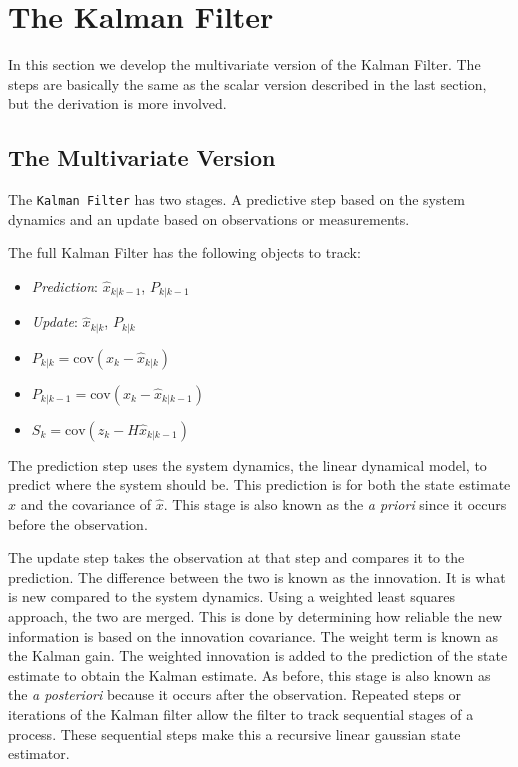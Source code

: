 \hypertarget{the-kalman-filter}{%
\section{The Kalman Filter}\label{the-kalman-filter}}

In this section we develop the multivariate version of the Kalman
Filter. The steps are basically the same as the scalar version described
in the last section, but the derivation is more involved.

\hypertarget{the-multivariate-version}{%
\subsection{The Multivariate Version}\label{the-multivariate-version}}

The \texttt{Kalman\ Filter} has two stages. A predictive step based on
the system dynamics and an update based on observations or measurements.

The full Kalman Filter has the following objects to track:

\begin{itemize}
\tightlist
\item
  \emph{Prediction}: \(\hat{x}_{k|k-1}\), \(P_{k|k-1}\)
\item
  \emph{Update}: \(\hat{x}_{k|k}\), \(P_{k|k}\)
\item
  \(P_{k|k} =  \textrm{cov}(x_k -  \hat{x}_{k|k})\)
\item
  \(P_{k|k-1} = \textrm{cov}(x_k - \hat{x}_{k|k-1})\)
\item
  \(S_{k} = \textrm{cov}(z_k - H\hat{x}_{k|k-1})\)
\end{itemize}

The prediction step uses the system dynamics, the linear dynamical
model, to predict where the system should be. This prediction is for
both the state estimate \(\hat{x}\) and the covariance of \(\hat{x}\).
This stage is also known as the \emph{a priori} since it occurs before
the observation.

The update step takes the observation at that step and compares it to
the prediction. The difference between the two is known as the
innovation. It is what is new compared to the system dynamics. Using a
weighted least squares approach, the two are merged. This is done by
determining how reliable the new information is based on the innovation
covariance. The weight term is known as the Kalman gain. The weighted
innovation is added to the prediction of the state estimate to obtain
the Kalman estimate. As before, this stage is also known as the \emph{a
posteriori} because it occurs after the observation. Repeated steps or
iterations of the Kalman filter allow the filter to track sequential
stages of a process. These sequential steps make this a recursive linear
gaussian state estimator.

